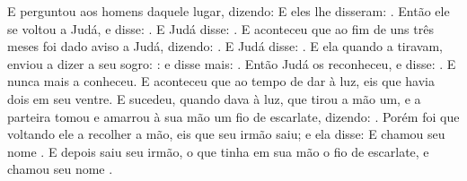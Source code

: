 {{  E perguntou aos homens daquele lugar, dizendo:  E eles lhe disseram: .
  Então ele se voltou a Judá, e disse: .
  E Judá disse: .
  E aconteceu que ao fim de uns três meses foi dado aviso a Judá, dizendo: . E Judá disse: .
  E ela quando a tiravam, enviou a dizer a seu sogro: : e disse mais: .
  Então Judá os reconheceu, e disse: . E nunca mais a conheceu.
  E aconteceu que ao tempo de dar à luz, eis que havia dois em seu ventre.
  E sucedeu, quando dava à luz, que tirou a mão um, e a parteira tomou e amarrou à sua mão um fio de escarlate, dizendo: .
  Porém foi que voltando ele a recolher a mão, eis que seu irmão saiu; e ela disse:  E chamou seu nome .
  E depois saiu seu irmão, o que tinha em sua mão o fio de escarlate, e chamou seu nome .
\par }

}
